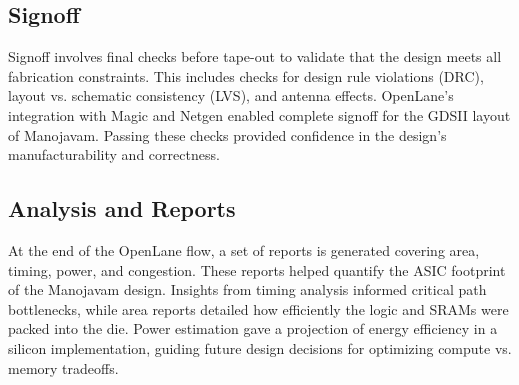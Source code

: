 \subsection{Signoff}
Signoff involves final checks before tape-out to validate that the design meets all fabrication constraints. This includes checks for design rule violations (DRC), layout vs. schematic consistency (LVS), and antenna effects. OpenLane’s integration with Magic and Netgen enabled complete signoff for the GDSII layout of Manojavam. Passing these checks provided confidence in the design’s manufacturability and correctness.

\subsection{Analysis and Reports}
At the end of the OpenLane flow, a set of reports is generated covering area, timing, power, and congestion. These reports helped quantify the ASIC footprint of the Manojavam design. Insights from timing analysis informed critical path bottlenecks, while area reports detailed how efficiently the logic and SRAMs were packed into the die. Power estimation gave a projection of energy efficiency in a silicon implementation, guiding future design decisions for optimizing compute vs. memory tradeoffs.


\begin{comment}
\section{Contents of this chapter}
This chapter should elaborate the following in detail.
\begin{enumerate}
\item Implementation details for hardware based projects
\item Top level Design for software based projects
\end{enumerate}
\end{comment}

\begin{comment}
You can add sections and sub sections to elaborate your project work done.

\vspace{0.75cm}

 \textbf{The chapters should not end with figures, instead bring the paragraph explaining about the figure at the end followed by a summary paragraph.}

After elaborating the various sections of the chapter (From Chapter 2 onwards), a summary paragraph should be written discussing the highlights of that particular chapter. This summary paragraph should not be numbered separately. This paragraph should connect the present chapter to the next chapter. 

\end{comment}